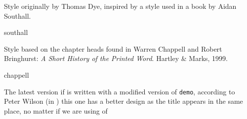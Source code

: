 Style originally by Thomas Dye, inspired by a style used in a book by
Aidan Southall.
\begin{showchapterstyle}{southall}
\newlength{\headindent}
\newlength{\rightblock}
\end{showchapterstyle}
Style based on the chapter heads found in Warren Chappell and Robert
Bringhurst: \emph{A Short History of the Printed Word}. Hartley \&
Marks, 1999.
\begin{showchapterstyle}{chappell}
\end{showchapterstyle}
The latest version if \cite{memmanadd} is written with a modified
version of \texttt{demo}, according to Peter Wilson (in
\cite{memmanadd}) this one has a better design as the title appears in
the same place, no matter if we are using  of
